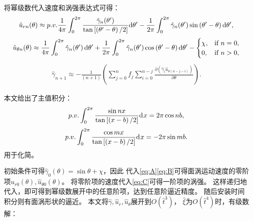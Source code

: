 \documentclass[UTF8,zihao=5]{ctexart} %
\begin{document}
将幂级数代入速度和涡强表达式可得：
\begin{gather}\label{eq:A} \hat{u}_{rn}(\theta)\approx {p.v.}\frac{1}{4{\rm \pi}} \int_{0}^{2{\rm \pi}} \frac{\hat{\gamma}_n(\theta')}{\tan{\left[\left(\theta'-\theta\right)/2\right]}}\textrm{d}\theta' -\frac{1}{2{\rm \pi}}\int_0^{2{\rm \pi}}\hat{\gamma}_n(\theta')\sin\left({\theta'-\theta}\right)\textrm{d}\theta', \end{gather}
\begin{gather}\label{eq:B} \hat{u}_{\theta n}(\theta)\approx\frac{1}{4{\rm \pi}} \int_{0}^{2{\rm \pi}}\hat{\gamma}_n(\theta')\,\textrm{d}\theta'+\frac{1}{2{\rm \pi}} \int_0^{2{\rm \pi}}\hat{\gamma}_n(\theta')\cos\left({\theta'-\theta}\right)\textrm{d}\theta'- \begin{cases} \chi, & \text{if } n=0, \\ 0, & \text{if } n>0, \end{cases} \end{gather}
\begin{gather}\label{eq:C} \hat{\gamma}_{n+1} \approx{-}\frac{1}{(n+1)} \left(\sum_{j=0}^{n}f_{j} \sum_{i=0}^{n-j} \frac{\partial (\hat{\gamma}_i \hat{u}_{\theta (n-j-i)})}{\partial \theta}\right). \end{gather}

本文给出了主值积分：
\begin{gather} {p.v.} \int_{0}^{2{\rm \pi}} \frac{\sin{n x}}{\tan{\left[\left(x-b\right)/2\right]}}\textrm{d}\kern0.06em x=2{\rm \pi}\cos{nb}, \end{gather}
\begin{gather}{p.v.} \int_{0}^{2{\rm \pi}} \frac{\cos mx}{\tan{\left[\left(x-b\right)/2\right]}}\textrm{d}\kern0.06em x={-}2{\rm \pi}\sin{mb}. \end{gather}
用于化简。

初始条件可得$\hat {\gamma }_0(\theta )=\sin \theta +\chi$，因此
代入\eqref{eq:A}\eqref{eq:B}可得面涡运动速度的零阶项$\hat {u}_{r0}(\theta ),\hat {u}_{\theta 0}(\theta )$。
将零阶项的速度代入\eqref{eq:C}可得一阶项的涡强。
这样递归地代入，即可得到幂级数展开中的任意阶项，达到任意阶逼近精度。
随后安装时间积分则有面涡形状的逼近。
本文将$\hat {\gamma }, \hat{u}_r, \hat{u}_\theta$展开到${O}(\hat {t}^{3})$，
$\hat {\xi }$为${O}(\hat {t}^{4})$时，有级数解：
\end{document}
